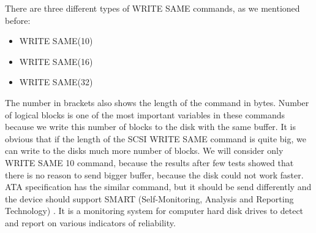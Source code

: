 There are three different types of WRITE SAME commands, as we mentioned before:
\begin{itemize}
	\setlength{\itemsep}{-2mm}
	\item WRITE SAME(10)
	\item WRITE SAME(16)
	\item WRITE SAME(32)
\end{itemize}
The number in brackets also shows the length of the command in bytes. Number of logical blocks is one of the most important variables in these commands because we write this number of blocks to the disk with the same buffer. It is obvious that if the length of the SCSI WRITE SAME command is quite big, we can write to the disks much more number of blocks. We will consider only WRITE SAME 10 command, because the results after few tests showed that there is no reason to send bigger buffer, because the disk could not work faster. ATA specification has the similar command, but it should be send differently and the device should support SMART (Self-Monitoring, Analysis and Reporting Technology) \cite{ata_spec}. It is a monitoring system for computer hard disk drives to detect and report on various indicators of reliability.

